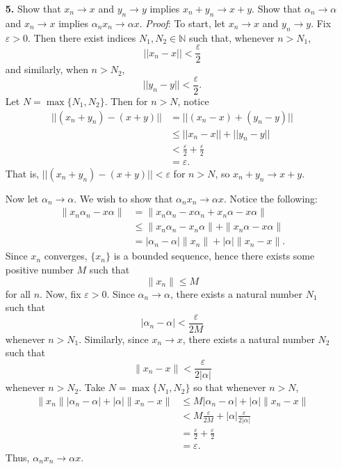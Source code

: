 \documentclass{article}
\begin{document}
\begin{itemize}
    

    \item[\textbf{5.}] Show that $x_n \to x$ and $y_n \to y$ implies $x_n + y_n \to x + y$. Show that $\alpha_n \to \alpha$ and $x_n \to x$ implies $\alpha_nx_n \to \alpha x$.
    \newline\newline
    \textit{Proof}: To start, let $x_n \to x$ and $y_n \to y$. Fix $\varepsilon > 0$. Then there exist indices $N_1,N_2 \in \mathbb{N}$ such that, whenever $n > N_1$,
    \[||x_n - x|| < \frac{\varepsilon}{2}\]
    and similarly, when $n > N_2$,
    \[||y_n - y|| < \frac{\varepsilon}{2}.\]
    Let $N = \max\{N_1,N_2\}$. Then for $n > N$, notice
    \begin{align*}
        ||(x_n + y_n) - (x + y)|| &= ||(x_n - x) + (y_n - y)||\\
        &\leq ||x_n - x|| + ||y_n - y||\\
        &< \frac{\varepsilon}{2} + \frac{\varepsilon}{2}\\
        &= \varepsilon.
    \end{align*}
    That is, $||(x_n + y_n) - (x + y)|| < \varepsilon$ for $n > N$, so $x_n + y_n \to x + y$.
    \newline 
    \vspace{0.3cm}
    
    Now let $\alpha_n \to \alpha$. We wish to show that $\alpha_nx_n \to \alpha x$. Notice the following:
    \begin{align*}
        \|x_n\alpha_n - x\alpha\| &= \|x_n\alpha_n - x\alpha_n + x_n\alpha - x\alpha\|\\
        &\leq \|x_n\alpha_n - x_n\alpha\| + \|x_n\alpha - x\alpha\|\\
        &= |\alpha_n - \alpha|\|x_n\| + |\alpha| \|x_n - x\| \tag*{(Homogeneity of the norm)}.
    \end{align*}
    Since $x_n$ converges, $\{x_n\}$ is a bounded sequence, hence there exists some positive number $M$ such that
    \[\|x_n\| \leq M\]
    for all $n$. Now, fix $\varepsilon > 0$. Since $\alpha_n \to \alpha$, there exists a natural number $N_1$ such that 
    \[|\alpha_n - \alpha| < \frac{\varepsilon}{2M}\]
    whenever $n > N_1$. Similarly, since $x_n \to x$, there exists a natural number $N_2$ such that
    \[\|x_n - x\| < \frac{\varepsilon}{2|\alpha|}\]
    whenever $n > N_2$. Take $N = \max\{N_1,N_2\}$ so that whenever $n > N$,
    \begin{align*}
        \|x_n\| |\alpha_n - \alpha| + |\alpha| \|x_n - x\| &\leq M |\alpha_n - \alpha| + |\alpha| \|x_n -x\|\\
        &< M \frac{\varepsilon}{2M} + |\alpha| \frac{\varepsilon}{2|\alpha|}\\
        &= \frac{\varepsilon}{2} + \frac{\varepsilon}{2}\\
        &= \varepsilon.
    \end{align*}
    Thus, $\alpha_nx_n \to \alpha x$.
    

\end{itemize}
\end{document}
